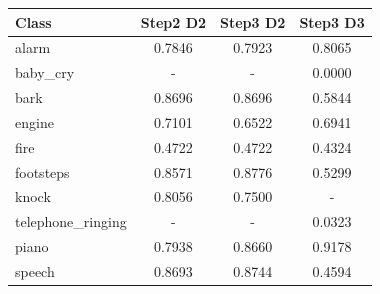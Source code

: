 \begin{tabular}{lccc}
\toprule
Class & Step2 D2 & Step3 D2 & Step3 D3 \\
\midrule
alarm & 0.7846 & 0.7923 & 0.8065 \\
baby_cry & - & - & 0.0000 \\
bark & 0.8696 & 0.8696 & 0.5844 \\
engine & 0.7101 & 0.6522 & 0.6941 \\
fire & 0.4722 & 0.4722 & 0.4324 \\
footsteps & 0.8571 & 0.8776 & 0.5299 \\
knock & 0.8056 & 0.7500 & - \\
telephone_ringing & - & - & 0.0323 \\
piano & 0.7938 & 0.8660 & 0.9178 \\
speech & 0.8693 & 0.8744 & 0.4594 \\
\bottomrule
\end{tabular}
